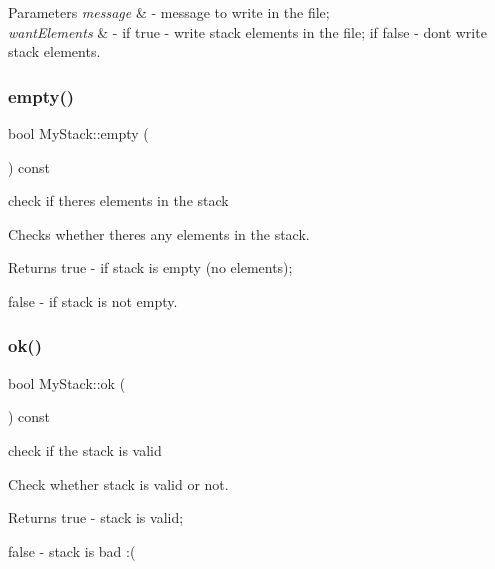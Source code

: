 \begin{DoxyParams}{Parameters}
{\em message} & -\/ message to write in the file; \\
\hline
{\em want\+Elements} & -\/ if {\ttfamily true} -\/ write stack elements in the file; if {\ttfamily false} -\/ don\textquotesingle{}t write stack elements. \\
\hline
\end{DoxyParams}
\mbox{\label{class_my_stack_a63f6a62fd6fa804501d564946512464b}} 
\subsubsection{\texorpdfstring{empty()}{empty()}}
{\footnotesize\ttfamily bool My\+Stack\+::empty (\begin{DoxyParamCaption}{ }\end{DoxyParamCaption}) const}



check if there\textquotesingle{}s elements in the stack 

Checks whether there\textquotesingle{}s any elements in the stack.

\begin{DoxyReturn}{Returns}
{\ttfamily true} -\/ if stack is empty (no elements); 

{\ttfamily false} -\/ if stack is not empty. 
\end{DoxyReturn}
\mbox{\label{class_my_stack_adcf03c60e2cc3c0fdc4384c6fc469066}} 
\subsubsection{\texorpdfstring{ok()}{ok()}}
{\footnotesize\ttfamily bool My\+Stack\+::ok (\begin{DoxyParamCaption}{ }\end{DoxyParamCaption}) const\hspace{0.3cm}{\ttfamily [private]}}



check if the stack is valid 

Check whether stack is valid or not.

\begin{DoxyReturn}{Returns}
{\ttfamily true} -\/ stack is valid; 

{\ttfamily false} -\/ stack is bad \+:( 
\end{DoxyReturn}
\mbox{\label{class_my_stack_a9f919749f79ab445c6437cac3830e7bb}} 

